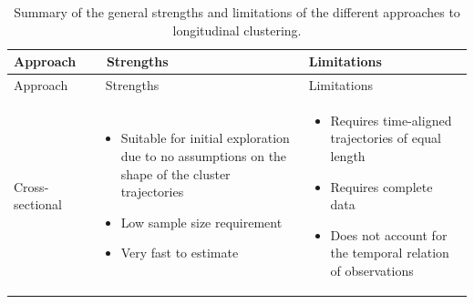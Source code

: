 \begin{longtable}[]{@{}
  >{\raggedright\arraybackslash}p{}
  >{\raggedright\arraybackslash}p{}
  >{\raggedright\arraybackslash}p{}@{}}
\caption{Summary of the general strengths and limitations of the different approaches to longitudinal clustering. \label{tbl:compare}}\tabularnewline
\toprule\noalign{}
\begin{minipage}[b]{\linewidth}\raggedright
Approach~
\end{minipage} & \begin{minipage}[b]{\linewidth}\raggedright
~Strengths
\end{minipage} & \begin{minipage}[b]{\linewidth}\raggedright
Limitations
\end{minipage} \\
\midrule\noalign{}
\endfirsthead
\toprule\noalign{}
\begin{minipage}[b]{\linewidth}\raggedright
Approach~
\end{minipage} & \begin{minipage}[b]{\linewidth}\raggedright
~Strengths
\end{minipage} & \begin{minipage}[b]{\linewidth}\raggedright
Limitations
\end{minipage} \\
\midrule\noalign{}
\endhead
\bottomrule\noalign{}
\endlastfoot
Cross-sectional & \begin{minipage}[t]{\linewidth}\raggedright
\begin{itemize}
\tightlist
\item
  Suitable for initial exploration due to no assumptions on the shape of the cluster trajectories
\item
  Low sample size requirement
\item
  Very fast to estimate
\end{itemize}
\end{minipage} & \begin{minipage}[t]{\linewidth}\raggedright
\begin{itemize}
\tightlist
\item
  Requires time-aligned trajectories of equal length
\item
  Requires complete data
\item
  Does not account for the temporal relation of observations
\end{itemize}

\end{minipage}
\end{longtable}
